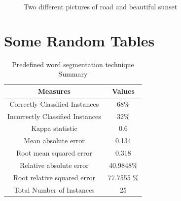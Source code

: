 \documentclass[a4paper, 12pt]{article}
\begin{document}
	\begin{figure}[H]
		\centering
  		\hfill	%
  		\vspace{1cm}
  		\caption{Two different pictures of road and beautiful sunset}
  		\label{fig:effctofnoise}
	\end{figure}
	\pagebreak
	
	\section{Some Random Tables}
	\begin{table}[H]
		\label{tab:bayoldsummery}
		\centering
		\caption{Predefined word segmentation technique Summary}
		\begin{tabular}{ | c | c | }
			\hline
			Measures & Values \\
			\hline\hline
			Correctly Classified Instances & 68\%  \\ 
			Incorrectly Classified Instances & 32\%  \\  
 			Kappa statistic & 0.6 \\   
			Mean absolute error & 0.134 \\
			Root mean squared error & 0.318 \\
			Relative absolute error & 40.9848\% \\
			Root relative squared error & 77.7555 \% \\
			Total Number of Instances & 25  \\
			\hline
		\end{tabular}
	\end{table}	
\end{document}
